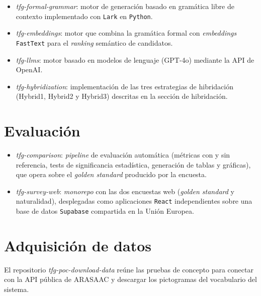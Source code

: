 \begin{itemize}
    \item \textit{tfg-formal-grammar}: motor de generación basado en gramática libre de contexto implementado con \texttt{Lark} en \texttt{Python}.
    \item \textit{tfg-embeddings}: motor que combina la gramática formal con \textit{embeddings} \texttt{FastText} para el \textit{ranking} semántico de candidatos.
    \item \textit{tfg-llms}: motor basado en modelos de lenguaje (GPT-4o) mediante la API de OpenAI.
    \item \textit{tfg-hybridization}: implementación de las tres estrategias de hibridación (Hybrid1, Hybrid2 y Hybrid3) descritas en la sección de hibridación.
\end{itemize}

\section{Evaluación}
\label{sec:repo-evaluacion}

\begin{itemize}
    \item \textit{tfg-comparison}: \textit{pipeline} de evaluación automática (métricas con y sin referencia, tests de significancia estadística, generación de tablas y gráficas), que opera sobre el \textit{golden standard} producido por la encuesta.
    \item \textit{tfg-survey-web}: \textit{monorepo} con las dos encuestas web (\textit{golden standard} y naturalidad), desplegadas como aplicaciones \texttt{React} independientes sobre una base de datos \texttt{Supabase} compartida en la Unión Europea.
\end{itemize}

\section{Adquisición de datos}
\label{sec:repo-datos}

El repositorio \textit{tfg-poc-download-data} reúne las pruebas de concepto para conectar con la API pública de ARASAAC y descargar los pictogramas del vocabulario del sistema.
